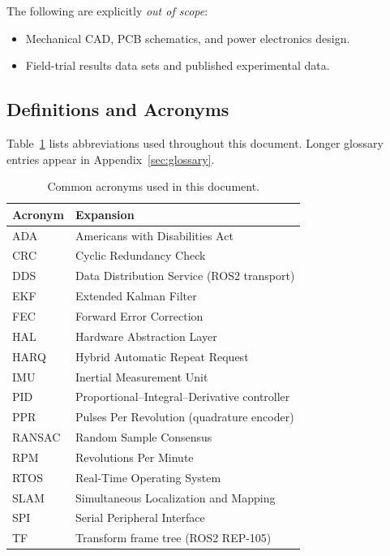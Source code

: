 \documentclass[11pt,letterpaper]{article}
\begin{document}
The following are explicitly \emph{out of scope}:
\begin{itemize}[leftmargin=1.4em,itemsep=2pt]
\item Mechanical CAD, PCB schematics, and power electronics design.
\item Field-trial results data sets and published experimental data.
\end{itemize}

\subsection{Definitions and Acronyms}
Table~\ref{tab:acronyms} lists abbreviations used throughout this
document. Longer glossary entries appear in Appendix~\ref{sec:glossary}.

\begin{table}[H]
\centering
\caption{Common acronyms used in this document.}
\label{tab:acronyms}
\small
\begin{tabularx}{\linewidth}{l X}
\toprule
\textbf{Acronym} & \textbf{Expansion} \\
\midrule
ADA   & Americans with Disabilities Act \\
CRC   & Cyclic Redundancy Check \\
DDS   & Data Distribution Service (ROS2 transport) \\
EKF   & Extended Kalman Filter \\
FEC   & Forward Error Correction \\
HAL   & Hardware Abstraction Layer \\
HARQ  & Hybrid Automatic Repeat Request \\
IMU   & Inertial Measurement Unit \\
PID   & Proportional--Integral--Derivative controller \\
PPR   & Pulses Per Revolution (quadrature encoder) \\
RANSAC & Random Sample Consensus \\
RPM   & Revolutions Per Minute \\
RTOS  & Real-Time Operating System \\
SLAM  & Simultaneous Localization and Mapping \\
SPI   & Serial Peripheral Interface \\
TF    & Transform frame tree (ROS2 REP-105) \\
\bottomrule
\end{tabularx}
\end{table}
\end{document}
